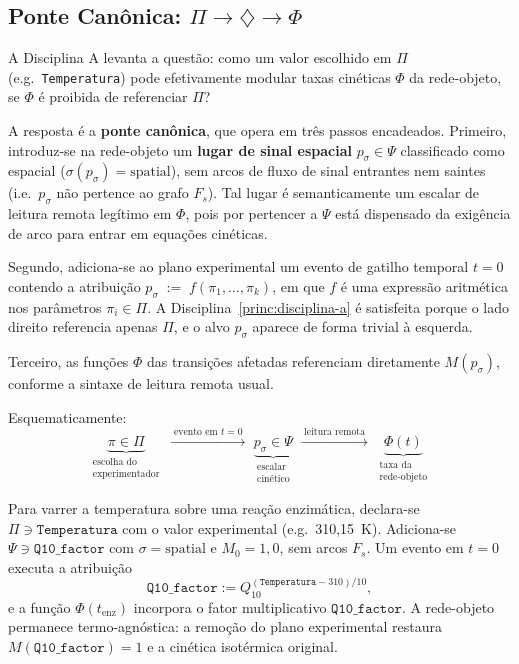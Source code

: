 \subsection{Ponte Canônica: $\Pi \to \diamondsuit \to \Phi$}
\label{subsec:ponte-canonica}

A Disciplina A levanta a questão: como um valor escolhido em $\Pi$
(e.g.\ \texttt{Temperatura}) pode efetivamente modular taxas cinéticas
$\Phi$ da rede-objeto, se $\Phi$ é proibida de referenciar $\Pi$?

A resposta é a \textbf{ponte canônica}, que opera em três passos encadeados.
Primeiro, introduz-se na rede-objeto um \textbf{lugar de sinal espacial}
$p_\sigma \in \Psi$ classificado como espacial
($\sigma(p_\sigma) = \text{spatial}$), sem arcos de fluxo de sinal entrantes
nem saintes (i.e.\ $p_\sigma$ não pertence ao grafo $F_s$). Tal lugar é
semanticamente um escalar de leitura remota legítimo em $\Phi$, pois por
pertencer a $\Psi$ está dispensado da exigência de arco para entrar em
equações cinéticas.

Segundo, adiciona-se ao plano experimental um evento de gatilho temporal
$t = 0$ contendo a atribuição
$p_\sigma \;{:=}\; f(\pi_1, \ldots, \pi_k)$, em que $f$ é uma expressão
aritmética nos parâmetros $\pi_i \in \Pi$. A Disciplina~\ref{princ:disciplina-a}
é satisfeita porque o lado direito referencia apenas $\Pi$, e o alvo
$p_\sigma$ aparece de forma trivial à esquerda.

Terceiro, as funções $\Phi$ das transições afetadas referenciam diretamente
$M(p_\sigma)$, conforme a sintaxe de leitura remota usual.

Esquematicamente:
\[
\underbrace{\pi \in \Pi}_{\substack{\text{escolha do} \\ \text{experimentador}}}
\;\xrightarrow{\;\text{evento em } t = 0\;}\;
\underbrace{p_\sigma \in \Psi}_{\substack{\text{escalar} \\ \text{cinético}}}
\;\xrightarrow{\;\text{leitura remota}\;}\;
\underbrace{\Phi(t)}_{\substack{\text{taxa da} \\ \text{rede-objeto}}}
\]

\begin{example}
\label{ex:ponte-temperatura}
Para varrer a temperatura sobre uma reação enzimática, declara-se
$\Pi \ni \texttt{Temperatura}$ com o valor experimental (e.g.\ 310,15~K).
Adiciona-se $\Psi \ni \texttt{Q10\_factor}$ com $\sigma = \text{spatial}$
e $M_0 = 1{,}0$, sem arcos $F_s$.
Um evento em $t = 0$ executa a atribuição
\[
  \texttt{Q10\_factor} := Q_{10}^{(\texttt{Temperatura} - 310)/10},
\]
e a função $\Phi(t_{\text{enz}})$ incorpora o fator multiplicativo
$\texttt{Q10\_factor}$.
A rede-objeto permanece termo-agnóstica: a remoção do plano experimental
restaura $M(\texttt{Q10\_factor}) = 1$ e a cinética isotérmica original.
\end{example}

